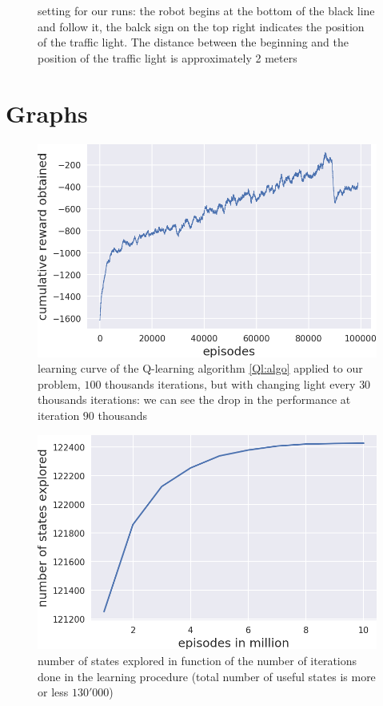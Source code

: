 \documentclass[14pt,a4paper]{article}
\theoremstyle{definition}
\begin{document}
\begin{figure}[h]
\caption{setting for our runs: the robot begins at the bottom of the black line and follow it, the balck sign on the top right indicates the position of the traffic light. The distance between the beginning and the position of the traffic light is approximately 2 meters}
\label{setting}
\end{figure}

\newpage

\section{Graphs} \label{GRAPHS}

\begin{figure}[H]
\centering
\captionsetup{justification=centering}
\includegraphics[scale=0.7]{img/Q_learning_curve_random_light.png}
\caption{learning curve of the Q-learning algorithm \ref{Ql:algo} applied to our problem, $100$ thousands iterations, but with changing light every $30$ thousands iterations: we can see the drop in the performance at iteration $90$ thousands}
\label{curve_random}
\end{figure}


\begin{figure}[H]
\centering
\captionsetup{justification=centering}
\includegraphics[scale=0.7]{img/exploration.png}
\caption{number of states explored in function of the number of iterations done in the learning procedure (total number of useful states is more or less $130'000$)}
\label{learning_numbers}
\end{figure}
\end{document}
